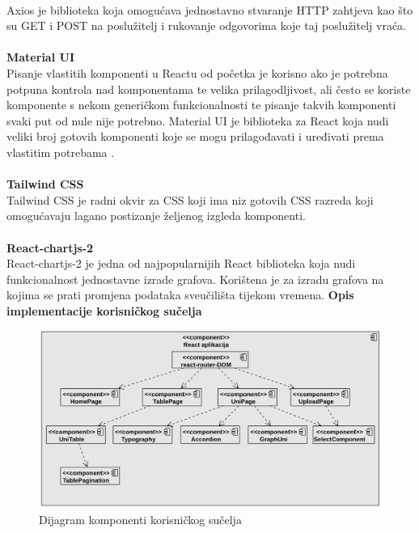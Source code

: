 \documentclass[times, utf8, zavrsni]{fer}
\begin{document}
\\ Axios je biblioteka koja omogućava jednostavno stvaranje HTTP zahtjeva kao što su GET i POST na poslužitelj i rukovanje odgovorima koje taj poslužitelj vraća.
\\
\\ \textbf{Material UI}
\\ Pisanje vlastitih komponenti u Reactu od početka je korisno ako je potrebna potpuna kontrola nad komponentama te velika prilagodljivost, ali
često se koriste komponente s nekom generičkom funkcionalnosti te pisanje takvih komponenti svaki put od nule nije potrebno. 
Material UI je biblioteka za React koja nudi veliki broj gotovih komponenti koje se mogu prilagođavati i uređivati prema vlastitim potrebama .
\\
\\ \textbf{Tailwind CSS}
\\ Tailwind CSS je radni okvir  za CSS  koji ima niz gotovih CSS razreda koji omogućavaju lagano postizanje 
željenog izgleda komponenti.
\\
\\ \textbf{React-chartjs-2}
\\ React-chartjs-2 je jedna od najpopularnijih React biblioteka koja nudi funkcionalnost jednostavne izrade grafova. Korištena je za izradu grafova na 
kojima se prati promjena podataka sveučilišta tijekom vremena.
\newpage\textbf{Opis implementacije korisničkog sučelja}
\begin{figure}[htb]
    \hspace{-1.3cm}
       \includegraphics[scale=0.35]{reactkomponente.png} 
       \caption{Dijagram komponenti korisničkog sučelja}
       \label{fig:reactkomponente}
       \end{figure}
\end{document}
